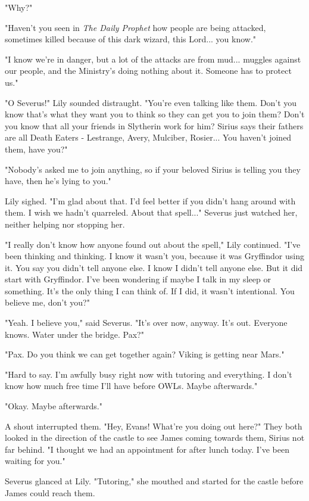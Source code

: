 \documentclass[a4paper,11pt]{article}
\begin{document}
"Why?"

"Haven't you seen in \emph{The Daily Prophet} how people are being attacked, sometimes killed because of this dark wizard, this Lord... you know."

"I know we're in danger, but a lot of the attacks are from mud... muggles against our people, and the Ministry's doing nothing about it. Someone has to protect us."

"O Severus!" Lily sounded distraught. "You're even talking like them. Don't you know that's what they want you to think so they can get you to join them? Don't you know that all your friends in Slytherin work for him? Sirius says their fathers are all Death Eaters - Lestrange, Avery, Mulciber, Rosier... You haven't joined them, have you?"

"Nobody's asked me to join anything, so if your beloved Sirius is telling you they have, then he's lying to you."

Lily sighed. "I'm glad about that. I'd feel better if you didn't hang around with them. I wish we hadn't quarreled. About that spell..." Severus just watched her, neither helping nor stopping her.

"I really don't know how anyone found out about the spell," Lily continued. "I've been thinking and thinking. I know it wasn't you, because it was Gryffindor using it. You say you didn't tell anyone else. I know I didn't tell anyone else. But it did start with Gryffindor. I've been wondering if maybe I talk in my sleep or something. It's the only thing I can think of. If I did, it wasn't intentional. You believe me, don't you?"

"Yeah. I believe you," said Severus. "It's over now, anyway. It's out. Everyone knows. Water under the bridge. Pax?"

"Pax. Do you think we can get together again? Viking is getting near Mars."

"Hard to say. I'm awfully busy right now with tutoring and everything. I don't know how much free time I'll have before OWLs. Maybe afterwards."

"Okay. Maybe afterwards."

A shout interrupted them. "Hey, Evans! What're you doing out here?" They both looked in the direction of the castle to see James coming towards them, Sirius not far behind. "I thought we had an appointment for after lunch today. I've been waiting for you."

Severus glanced at Lily. "Tutoring," she mouthed and started for the castle before James could reach them.
\end{document}
